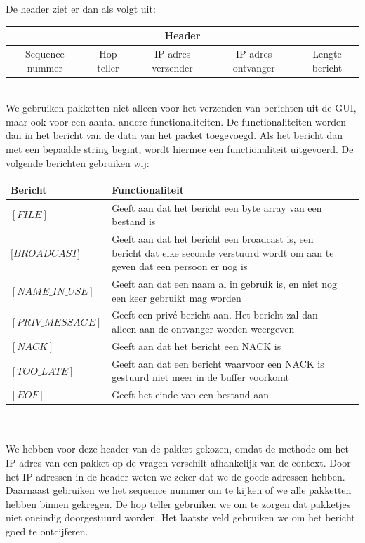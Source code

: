 \documentclass{article}
\begin{document}
De header ziet er dan als volgt uit:
\\
\begin{tabular}{| c | c | c | c | c |}
\hline
\multicolumn{5}{|c|}{Header}  \\
\hline
Sequence nummer & Hop teller & IP-adres verzender & IP-adres ontvanger & Lengte bericht \\
\hline
\end{tabular}
\phantom{YOLO}
\\
\noindent We gebruiken pakketten niet alleen voor het verzenden van berichten uit de GUI, maar ook voor een aantal andere functionaliteiten. De functionaliteiten worden dan in het bericht van de data van het packet toegevoegd. Als het bericht dan met een bepaalde string begint, wordt hiermee een functionaliteit uitgevoerd.
\newpage
De volgende berichten gebruiken wij:
\\

\begin{tabular}{l  p{6cm}l }
Bericht & Functionaliteit \\
\hline
$[FILE]$ & Geeft aan dat het bericht een byte array van een bestand is \\
$[BROADCAST$] & Geeft aan dat het bericht een broadcast is, een bericht dat elke seconde verstuurd wordt om aan te geven dat een persoon er nog is \\
$[NAME\_IN\_USE]$ & Geeft aan dat een naam al in gebruik is, en niet nog een keer gebruikt mag worden \\
$[PRIV\_MESSAGE]$ & Geeft een priv\'{e} bericht aan. Het bericht zal dan alleen aan de ontvanger worden weergeven \\
$[NACK]$ & Geeft aan dat het bericht een NACK is \\
$[TOO\_LATE]$ & Geeft aan dat een bericht waarvoor een NACK is gestuurd niet meer in de buffer voorkomt \\
$[EOF]$ & Geeft het einde van een bestand aan
\end{tabular} \\
\phantom{YOLO} \\
We hebben voor deze header van de pakket gekozen, omdat de methode om het IP-adres van een pakket op de vragen verschilt afhankelijk van de context. Door het IP-adressen in de header weten we zeker dat we de goede adressen hebben. Daarnaast gebruiken we het sequence nummer om te kijken of we alle pakketten hebben binnen gekregen. De hop teller gebruiken we om te zorgen dat pakketjes niet oneindig doorgestuurd worden. Het laatste veld gebruiken we om het bericht goed te ontcijferen. 
\end{document}
